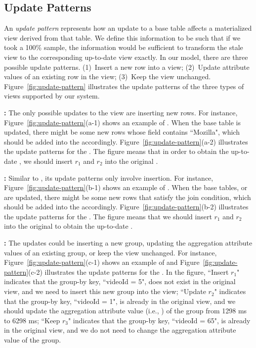 \subsection{Update Patterns}\label{subsec:pattern}
An \emph{update pattern} represents how an update to a base table affects a materialized view derived from that table.
We define this information to be such that if we took a 100\% sample, the information would be sufficient to transform the stale view to the corresponding up-to-date view exactly. 
In our model, there are three possible update patterns. (1)~Insert a new row into a view;
(2)~Update attribute values of an existing row in the view; (3)~Keep the view unchanged.
Figure~\ref{fig:update-pattern} illustrates the update patterns of the three types of views supported by our system.

\vspace{0.5em}

{\noindent \bf \spview :} The only possible updates to the view are inserting new rows.  
For instance, Figure~\ref{fig:update-pattern}(a-1) shows an example of \spview. When the base table  is updated, there might be some new rows whose  field contains ``Mozilla", which should be added into the \spview accordingly. Figure~\ref{fig:update-pattern}(a-2) illustrates the update patterns for the \spview. The figure means that in order to obtain the up-to-date \spview, we should insert $r_1$ and $r_2$ into the original \spview.

\vspace{0.5em}

{\noindent \bf \fjview :} Similar to \spview, its update patterns only involve insertion. For instance, Figure~\ref{fig:update-pattern}(b-1) shows an example of \fjview. When the base tables,  or  are updated, there might be some new rows that satisfy the join condition, which should be added into the \fjview accordingly. Figure~\ref{fig:update-pattern}(b-2) illustrates the update patterns for the \fjview. The figure means that we should insert $r_1$ and $r_2$ into the original \fjview to obtain the up-to-date \fjview.

\vspace{0.5em}

{\noindent \bf \aggview :} The updates could be inserting a new group, updating the aggregation attribute values of an existing group, or keep the view unchanged. 
For instance, Figure~\ref{fig:update-pattern}(c-1) shows an example of \aggview and Figure~\ref{fig:update-pattern}(c-2) illustrates the update patterns for the \aggview. In the figure, ``Insert $r_1$" indicates that the group-by key, ``videoId = 5", does not exist in the original view, and we need to insert this new group into the view; ``Update $r_2$" indicates that the group-by key, ``videoId = 1", is already in the original view, and we should update the aggregation attribute value (i.e., ) of the group from 1298 ms to 6298 ms; ``Keep $r_3$" indicates that the group-by key, ``videoId = 65", is already in the original  view, and we do not need to change the aggregation attribute value of the group.    



